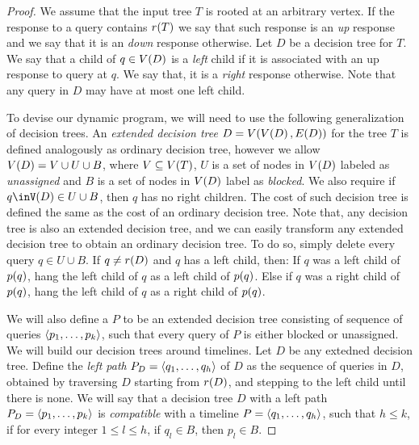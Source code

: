 \begin{theorem}
\begin{proof}
We assume that the input tree $T$ is rooted at an arbitrary vertex. If the response to a query contains $r\mathopen{}\left( T \right)$ we say that such response is an \textit{up} response and we say that it is an \textit{down} response otherwise. Let $D$ be a decision tree for $T$. We say that a child of $q\in V\mathopen{}\left( D \right)$ is a \textit{left} child if it is associated with an up response to query at $q$. We say that, it is a \textit{right} response otherwise. Note that any query in $D$ may have at most one left child.

To devise our dynamic program, we will need to use the following generalization of decision trees. An \textit{extended decision tree} $D=V\mathopen{}\left( V\mathopen{}\left( D \right), E\mathopen{}\left( D \right) \right)$ for the tree $T$ is defined analogously as ordinary decision tree, however we allow $V\mathopen{}\left( D \right)=V\cup U \cup B$, where $V\subseteq V\mathopen{}\left( T \right)$, $U$ is a set of nodes in $V\mathopen{}\left( D \right)$ labeled as \textit{unassigned} and $B$ is a set of nodes in $V\mathopen{}\left( D \right)$ label as \textit{blocked}. We also require if $q\inV\br{D}\in U\cup B$, then $q$ has no right children. The cost of such decision tree is defined the same as the cost of an ordinary decision tree. Note that, any decision tree is also an extended decision tree, and we can easily transform any extended decision tree to obtain an ordinary decision tree. To do so, simply delete every query $q\in U\cup B$. If $q\neq r\mathopen{}\left( D \right)$ and $q$ has a left child, then: If $q$ was a left child of $p\mathopen{}\left( q \right)$, hang the left child of $q$ as a left child of $p\mathopen{}\left( q \right)$. Else if $q$ was a right child of $p\mathopen{}\left( q \right)$, hang the left child of $q$ as a right child of $p\mathopen{}\left( q \right)$.

We will also define a  $P$ to be an extended decision tree consisting of sequence of queries $\mathopen{}\langle p_1,\dots,p_k \rangle$, such that every query of $P$ is either blocked or unassigned. We will build our decision trees around timelines. Let $D$ be any extedned decision tree. Define the \textit{left path} $P_D=\mathopen{}\langle q_1,\dots,q_h \rangle$ of $D$ as the sequence of queries in $D$, obtained by traversing $D$ starting from $r\mathopen{}\left( D \right)$, and stepping to the left child until there is none. We will say that a decision tree $D$ with a left path $P_D=\mathopen{}\langle p_1,\dots,p_k \rangle$ is \textit{compatible} with a timeline $P=\mathopen{}\langle q_1,\dots,q_h \rangle$, such that $h\leq k$, if for every integer $1\leq l \leq h$, if $q_l\in B$, then $p_l\in B$. 


\end{proof}
\end{theorem}
